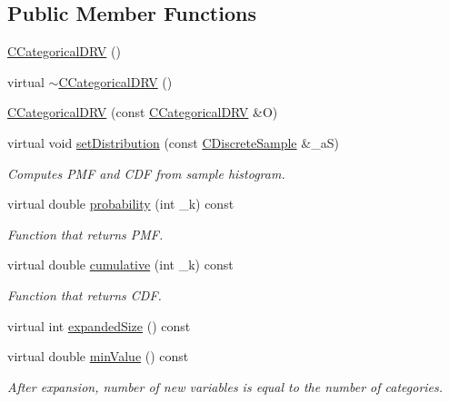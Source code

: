 \subsection*{Public Member Functions}
\begin{DoxyCompactItemize}
\item 
\hyperlink{class_c_categorical_d_r_v_a4fec729c76cfbfb22e19ed4a47b3d8f6}{C\-Categorical\-D\-R\-V} ()
\item 
virtual \hyperlink{class_c_categorical_d_r_v_a3e3e653c5b11c99ab6c9ad352cd1a5ee}{$\sim$\-C\-Categorical\-D\-R\-V} ()
\item 
\hyperlink{class_c_categorical_d_r_v_afec3ee33d70f726e48c2cfeff9644196}{C\-Categorical\-D\-R\-V} (const \hyperlink{class_c_categorical_d_r_v}{C\-Categorical\-D\-R\-V} \&O)
\item 
virtual void \hyperlink{class_c_categorical_d_r_v_aba3393786eddeb6a235cd1e58d88c280}{set\-Distribution} (const \hyperlink{class_c_discrete_sample}{C\-Discrete\-Sample} \&\-\_\-a\-S)
\begin{DoxyCompactList}\small\item\em Computes P\-M\-F and C\-D\-F from sample histogram. \end{DoxyCompactList}\item 
virtual double \hyperlink{class_c_categorical_d_r_v_a7bbfb60b24d3aa7ef4aaa42212eeb638}{probability} (int \-\_\-k) const 
\begin{DoxyCompactList}\small\item\em Function that returns P\-M\-F. \end{DoxyCompactList}\item 
virtual double \hyperlink{class_c_categorical_d_r_v_a65d62077439f102b8e68a98e32a71df5}{cumulative} (int \-\_\-k) const 
\begin{DoxyCompactList}\small\item\em Function that returns C\-D\-F. \end{DoxyCompactList}\item 
virtual int \hyperlink{class_c_categorical_d_r_v_a385ff0c56ffc1c32b57f6b73ec4e1b79}{expanded\-Size} () const 
\item 
virtual double \hyperlink{class_c_categorical_d_r_v_a2b4cfded808f058c38d931ac4c74ad31}{min\-Value} () const 
\begin{DoxyCompactList}\small\item\em After expansion, number of new variables is equal to the number of categories. \end{DoxyCompactList}\item 

\end{DoxyCompactItemize}
